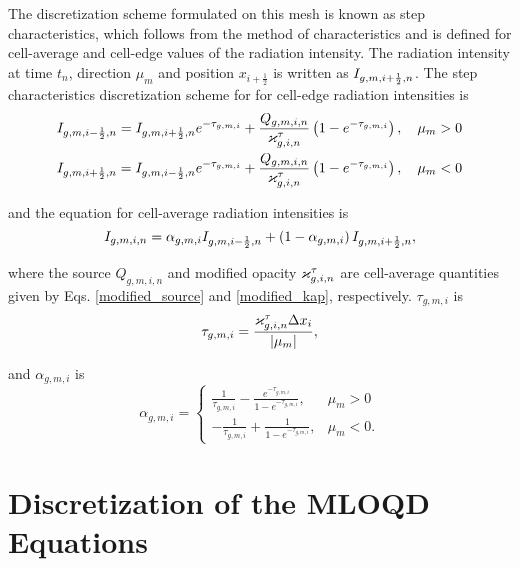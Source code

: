 	The discretization scheme formulated on this mesh is known as step characteristics, which follows from the method of characteristics and is defined for cell-average and cell-edge values of the radiation intensity. The radiation intensity at time $t_n$, direction $\mu_m$ and position $x_{i+\frac{1}{2}}$ is written as $I_{g,m,i+\frac{1}{2},n}$. The step characteristics discretization scheme for  for cell-edge radiation intensities is
	\begin{subequations}
		\begin{align}
			&I_{g,m,i-\frac{1}{2},n} = I_{g,m,i+\frac{1}{2},n} e^{-\tau_{g,m,i}} + \frac{Q_{g,m,i,n}}{\varkappa_{g,i,n}^\tau}\left(1 - e^{-\tau_{g,m,i}}\right), \quad \mu_m > 0\\
			&I_{g,m,i+\frac{1}{2},n} = I_{g,m,i-\frac{1}{2},n} e^{-\tau_{g,m,i}} + \frac{Q_{g,m,i,n}}{\varkappa_{g,i,n}^\tau}\left(1 - e^{-\tau_{g,m,i}}\right), \quad \mu_m < 0
		\end{align}
		\label{step_edges}
	\end{subequations}
	
	and the equation for cell-average radiation intensities is
	\begin{equation}
		I_{g,m,i,n} = \alpha_{g,m,i}I_{g,m,i-\frac{1}{2},n} + \left(1-\alpha_{g,m,i}\right)I_{g,m,i+\frac{1}{2},n}, \label{step_avgs}
	\end{equation}
	
	where the source $Q_{g,m,i,n}$ and modified opacity $\varkappa_{g,i,n}^\tau$ are cell-average quantities given by Eqs. \eqref{modified_source} and \eqref{modified_kap}, respectively. $\tau_{g,m,i}$ is
	\begin{equation}
		\tau_{g,m,i} = \frac{\varkappa_{g,i,n}^\tau\Delta x_{i}}{|\mu_m|},
	\end{equation}
	
	and $\alpha_{g,m,i}$ is
	\begin{equation}
		\alpha_{g,m,i} = \left\{ \begin{array}{ll}
			\frac{1}{\tau_{g,m,i}} - \frac{e^{-\tau_{g,m,i}}}{1-e^{-\tau_{g,m,i}}}, & \mu_m>0\\
			-\frac{1}{\tau_{g,m,i}} + \frac{1}{1-e^{-\tau_{g,m,i}}}, & \mu_m<0.
		\end{array} \right.
	\end{equation}
	
\section{Discretization of the MLOQD Equations} \label{mloqd_disc}


